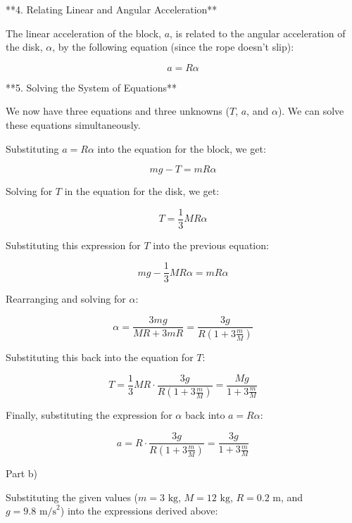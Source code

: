 \documentclass{article}
\begin{document}
**4. Relating Linear and Angular Acceleration**

The linear acceleration of the block, $a$, is related to the angular acceleration of the disk, $\alpha$, by the following equation (since the rope doesn't slip):

\begin{equation*}
a = R\alpha
\end{equation*}

**5. Solving the System of Equations**

We now have three equations and three unknowns ($T$, $a$, and $\alpha$). We can solve these equations simultaneously.

Substituting $a=R\alpha$ into the equation for the block, we get:

\begin{equation*}
mg - T = mR\alpha
\end{equation*}

Solving for $T$ in the equation for the disk, we get:

\begin{equation*}
T = \frac{1}{3}MR\alpha
\end{equation*}

Substituting this expression for $T$ into the previous equation:

\begin{equation*}
mg - \frac{1}{3}MR\alpha = mR\alpha
\end{equation*}

Rearranging and solving for $\alpha$:

\begin{equation*}
\alpha = \frac{3mg}{MR + 3mR} = \frac{3g}{R(1+3\frac{m}{M})}
\end{equation*}

Substituting this back into the equation for $T$:

\begin{equation*}
T = \frac{1}{3}MR \cdot \frac{3g}{R(1+3\frac{m}{M})} = \frac{Mg}{1+3\frac{m}{M}}
\end{equation*}

Finally, substituting the expression for $\alpha$ back into $a=R\alpha$:

\begin{equation*}
a = R \cdot \frac{3g}{R(1+3\frac{m}{M})} = \frac{3g}{1+3\frac{m}{M}}
\end{equation*}

Part b)

Substituting the given values ($m=3 \text{ kg}$, $M=12 \text{ kg}$, $R=0.2 \text{ m}$, and $g=9.8 \text{ m/s}^2$) into the expressions derived above:
\end{document}
